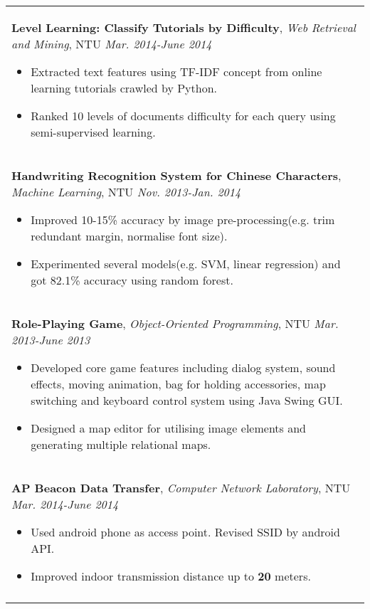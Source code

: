 \documentclass[a4paper,10pt]{article} %
\begin{document}
\begin{tabular}{p{17cm}}
\normalsize\textbf{Level Learning: Classify Tutorials by Difficulty}, {\it{Web Retrieval and Mining}}, NTU \hfill {\it Mar. 2014-June 2014}
\vspace{0.5mm}
\begin{itemize}
\item Extracted text features using TF-IDF concept from online learning tutorials crawled by Python.
\item Ranked 10 levels of documents difficulty for each query using semi-supervised learning.\vspace*{-\baselineskip}
\end{itemize}\\
\vspace{0.5mm}

\normalsize\textbf{Handwriting Recognition System for Chinese Characters}, {\it{Machine Learning}}, NTU  \hfill {\it Nov. 2013-Jan. 2014}
\vspace{0.5mm}
\begin{itemize}
\item Improved 10-15\% accuracy by image pre-processing(e.g. trim redundant margin, normalise font size).
\item Experimented several models(e.g. SVM, linear regression) and got 82.1\% accuracy using random forest.\vspace*{-\baselineskip}
\end{itemize}\\
\vspace{0.5mm}

\normalsize\textbf{Role-Playing Game}, {\it{Object-Oriented Programming}}, NTU \hfill {\it Mar. 2013-June 2013}
\vspace{0.5mm}
\begin{itemize}
\item Developed core game features including dialog system, sound effects, moving animation, bag for holding accessories, map switching and keyboard control system using Java Swing GUI.
\item Designed a map editor for utilising image elements and generating multiple relational maps.  \vspace*{-\baselineskip}
\end{itemize}\\

\normalsize\textbf{AP Beacon Data Transfer}, {\it{Computer Network Laboratory}}, NTU  \hfill {\it Mar. 2014-June 2014}
\vspace{0.5mm}
\begin{itemize}
\item Used android phone as access point. Revised SSID by android API.
\item Improved indoor transmission distance up to \textbf{20} meters. \vspace*{-\baselineskip}
\end{itemize}\\
\vspace{0.5mm}


\end{tabular}
\end{document}
